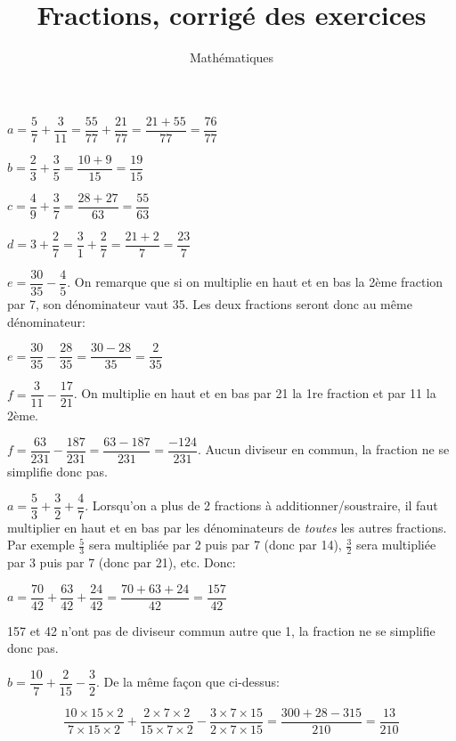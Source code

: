 \documentclass[a4paper,12pt]{scrartcl}
\date{}
\title{Fractions, corrigé des exercices}
\author{Mathématiques}
\begin{document}
\maketitle


\question{}

$a = \dfrac{5}{7} + \dfrac{3}{11} = \dfrac{55}{77} + \dfrac{21}{77} = \dfrac{21+55}{77} = \dfrac{76}{77}$

\question{}
$b = \dfrac{2}{3} + \dfrac{3}{5} = \dfrac{10 + 9}{15} = \dfrac{19}{15}$

\question{}
$c = \dfrac{4}{9} + \dfrac{3}{7} = \dfrac{28 + 27}{63} = \dfrac{55}{63}$

\question{}
$d = 3 + \dfrac{2}{7} = \dfrac{3}{1} + \dfrac{2}{7} = \dfrac{21 + 2}{7} = \dfrac{23}{7}$

\question{}
$e = \dfrac{30}{35} - \dfrac{4}{5}$. On remarque que si on multiplie en haut et en bas la 2ème fraction par 7, son dénominateur vaut 35. Les deux fractions seront donc au même dénominateur:

$e = \dfrac{30}{35} - \dfrac{28}{35} = \dfrac{30-28}{35} = \dfrac{2}{35}$

\question{}
$f = \dfrac{3}{11} - \dfrac{17}{21}$. On multiplie en haut et en bas par 21 la 1re fraction et par 11 la 2ème.

$f = \dfrac{63}{231} - \dfrac{187}{231} = \dfrac{63-187}{231} = \dfrac{-124}{231}$. Aucun diviseur en commun, la fraction ne se simplifie donc pas.


\question{}
$a = \dfrac{5}{3} + \dfrac{3}{2} + \dfrac{4}{7}$. Lorsqu'on a plus de 2 fractions à additionner/soustraire, il faut multiplier en haut et en bas par les dénominateurs de \emph{toutes} les autres fractions. Par exemple $\frac{5}{3}$ sera multipliée par 2 puis par 7 (donc par 14), $\frac{3}{2}$ sera multipliée par 3 puis par 7 (donc par 21), etc. Donc:

$a = \dfrac{70}{42} + \dfrac{63}{42} + \dfrac{24}{42} = \dfrac{70+63+24}{42} = \dfrac{157}{42}$

157 et 42 n'ont pas de diviseur commun autre que 1, la fraction ne se simplifie donc pas.

\question{}
$b = \dfrac{10}{7} + \dfrac{2}{15} - \dfrac{3}{2}$. De la même façon que ci-dessus:

$$\dfrac{10 \times 15 \times 2}{7 \times 15 \times 2} + \dfrac{2 \times 7 \times 2}{15 \times 7 \times 2} - \dfrac{3 \times 7 \times 15}{2 \times 7 \times 15} = \dfrac{300+28-315}{210} = \dfrac{13}{210}$$
\end{document}
